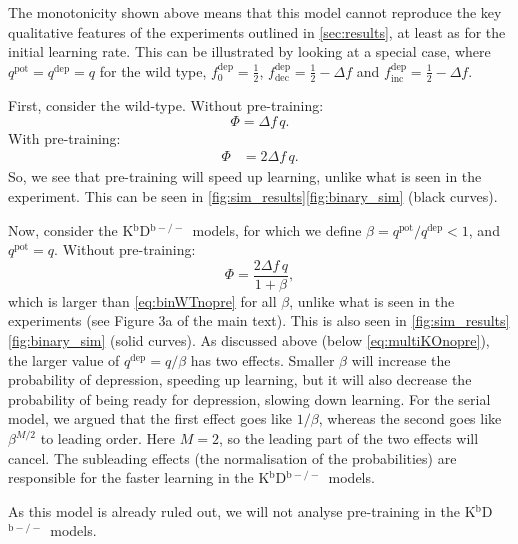 \documentclass[10pt]{article}
\newcommand{\pot}{^{\text{pot}}}
\newcommand{\dep}{^{\text{dep}}}
\newcommand{\inc}{_{\text{inc}}}
\newcommand{\dec}{_{\text{dec}}}
\newcommand{\KO}{K$^\mathrm{b}$D$^{\mathrm{b}-/-}$}
\newcommand{\modelfig}[1][a]{Figure 3#1 of the main text}
\begin{document}
The monotonicity shown above means that this model cannot reproduce the key qualitative features of the experiments outlined in \autoref{sec:results}, at least as for the initial learning rate.
This can be illustrated by looking at a special case, where $q\pot = q\dep = q$ for the wild type, $f\dep_0 = \frac{1}{2}$, $f\dep\dec = \frac{1}{2} - \Delta f$ and $f\dep\inc = \frac{1}{2} - \Delta f$.

First, consider the wild-type.
Without pre-training:
%
\begin{equation}\label{eq:binWTnopre}
  \Phi = {\Delta f}\, q.
\end{equation}
%
With pre-training:
%
\begin{equation}\label{eq:binWTpre}
\begin{aligned}
  \Phi &= 2{\Delta f}\, q.
\end{aligned}
\end{equation}
%
So, we see that pre-training will speed up learning, unlike what is seen in the experiment.
This can be seen in
\autoref{fig:sim_results}\ref{fig:binary_sim} %
(black curves).

Now, consider the \KO\ models, for which we define $\beta=q\pot/q\dep<1$, and $q\pot=q$.
Without pre-training:
%
\begin{equation}\label{eq:binKOnopre}
  \Phi = \frac{2{\Delta f}\, q}{1+\beta},
\end{equation}
%
which is larger than \eqref{eq:binWTnopre} for all $\beta$, unlike what is seen in the experiments (see \modelfig).
This is also seen in
\autoref{fig:sim_results}\ref{fig:binary_sim} %
(solid curves).
As discussed above (below \eqref{eq:multiKOnopre}), the larger value of $q\dep=q/\beta$ has two effects.
Smaller $\beta$ will increase the probability of depression, speeding up learning, but it will also decrease the probability of being ready for depression, slowing down learning.
For the serial model, we argued that the first effect goes like $1/\beta$, whereas the second goes like $\beta^{M/2}$ to leading order.
Here $M=2$, so the leading part of the two effects will cancel.
The subleading effects (the normalisation of the probabilities) are responsible for the faster learning in the \KO\ models.

As this model is already ruled out, we will not analyse pre-training in the \KO\ models.
\end{document}
